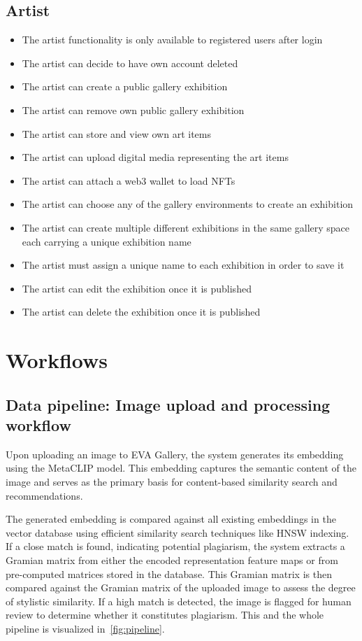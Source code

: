 \section{Artist}
    \begin{itemize}
        \item The artist functionality is only available to registered users after login
        \item The artist can decide to have own account deleted
        \item The artist can create a public gallery exhibition
        \item The artist can remove own public gallery exhibition
        \item The artist can store and view own art items
        \item The artist can upload digital media representing the art items
        \item The artist can attach a web3 wallet to load NFTs
        \item The artist can choose any of the gallery environments to create an exhibition
        \item The artist can create multiple different exhibitions in the same gallery space each carrying a unique exhibition name
        \item The artist must assign a unique name to each exhibition in order to save it
        \item The artist can edit the exhibition once it is published
        \item The artist can delete the exhibition once it is published
    \end{itemize}


\chapter{Workflows}
\section{Data pipeline: Image upload and processing workflow}

Upon uploading an image to EVA Gallery, the system generates its embedding using the MetaCLIP model. This embedding captures the semantic content of the image and serves as the primary basis for content-based similarity search and recommendations.

The generated embedding is compared against all existing embeddings in the vector database using efficient similarity search techniques like HNSW indexing. If a close match is found, indicating potential plagiarism, the system extracts a Gramian matrix from either the encoded representation feature maps or from pre-computed matrices stored in the database. This Gramian matrix is then compared against the Gramian matrix of the uploaded image to assess the degree of stylistic similarity. If a high match is detected, the image is flagged for human review to determine whether it constitutes plagiarism. This and the whole pipeline is visualized in~\autoref{fig:pipeline}.

